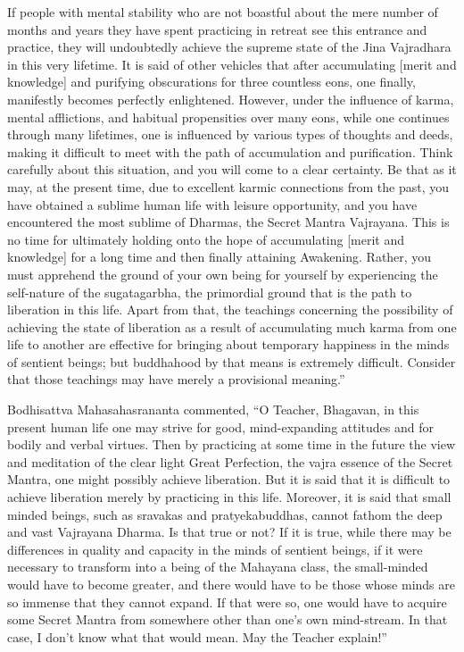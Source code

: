 \documentclass[a4paper,11pt,twoside,final]{book}
\begin{document}
If people with mental stability who are not boastful about the mere
number of months and years they have spent practicing in retreat see
this entrance and practice, they will undoubtedly achieve the supreme
state of the Jina Vajradhara in this very lifetime. It is said of
other vehicles that after accumulating [merit and knowledge] and
purifying obscurations for three countless eons, one finally,
manifestly becomes perfectly enlightened. However, under the influence
of karma, mental afflictions, and habitual propensities over many
eons, while one continues through many lifetimes, one is influenced by
various types of thoughts and deeds, making it difficult to meet with
the path of accumulation and purification. Think carefully about this
situation, and you will come to a clear certainty.  Be that as it may,
at the present time, due to excellent karmic connections from the
past, you have obtained a sublime human life with leisure opportunity,
and you have encountered the most sublime of Dharmas, the Secret
Mantra Vajrayana. This is no time for ultimately holding onto the hope
of accumulating [merit and knowledge] for a long time and then finally
attaining Awakening. Rather, you must apprehend the ground of your own
being for yourself by experiencing the self-nature of the
sugatagarbha, the primordial ground that is the path to liberation in
this life. Apart from that, the teachings concerning the possibility
of achieving the state of liberation as a result of accumulating much
karma from one life to another are effective for bringing about
temporary happiness in the minds of sentient beings; but buddhahood by
that means is extremely difficult. Consider that those teachings may
have merely a provisional meaning.''

Bodhisattva Mahasahasrananta commented, ``O Teacher, Bhagavan, in this
present human life one may strive for good, mind-expanding attitudes
and for bodily and verbal virtues. Then by practicing at some time in
the future the view and meditation of the clear light Great
Perfection, the vajra essence of the Secret Mantra, one might possibly
achieve liberation. But it is said that it is difficult to achieve
liberation merely by practicing in this life. Moreover, it is said
that small minded beings, such as sravakas and pratyekabuddhas, cannot
fathom the deep and vast Vajrayana Dharma. Is that true or not? If it
is true, while there may be differences in quality and capacity in the
minds of sentient beings, if it were necessary to transform into a
being of the Mahayana class, the small-minded would have to become
greater, and there would have to be those whose minds are so immense
that they cannot expand. If that were so, one would have to acquire
some Secret Mantra from somewhere other than one's own mind-stream. In
that case, I don't know what that would mean. May the Teacher
explain!''
\end{document}
